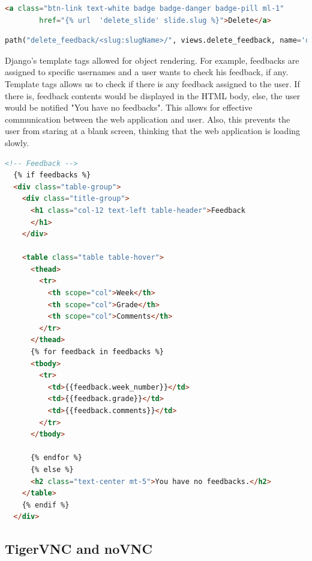 \documentclass{l4proj}
\begin{document}
\begin{lstlisting}[language=HTML, caption={The slug, typically used in URL for a short label of something, is being passed to Django's URL handling.}, label=lst:slide_deletion_template_to_url]
<a class="btn-link text-white badge badge-danger badge-pill ml-1"
        href="{% url  'delete_slide' slide.slug %}">Delete</a>
\end{lstlisting}

\begin{lstlisting}[language=python, caption={Django's URL handling receives it and sends it to the corresponding view.}, label=lst:slide_deletion_url_to_view]
path("delete_feedback/<slug:slugName>/", views.delete_feedback, name='delete_feedback'),
\end{lstlisting}


Django's template tags allowed for object rendering. For example, feedbacks are assigned to specific usernames and a user wants to check his feedback, if any. Template tags allows us to check if there is any feedback assigned to the user. If there is, feedback contents would be displayed in the HTML body, else, the user would be notified "You have no feedbacks". This allows for effective communication between the web application and user. Also, this prevents the user from staring at a blank screen, thinking that the web application is loading slowly. 

\begin{lstlisting}[language=HTML, caption={Django's template tag is used to check and display user feedback.}, label=lst:feedback_page]
 <!-- Feedback -->
  {% if feedbacks %}
  <div class="table-group">
    <div class="title-group">
      <h1 class="col-12 text-left table-header">Feedback
      </h1>
    </div>

    <table class="table table-hover">
      <thead>
        <tr>
          <th scope="col">Week</th>
          <th scope="col">Grade</th>
          <th scope="col">Comments</th>
        </tr>
      </thead>
      {% for feedback in feedbacks %}
      <tbody>
        <tr>
          <td>{{feedback.week_number}}</td>
          <td>{{feedback.grade}}</td>
          <td>{{feedback.comments}}</td>
        </tr>
      </tbody>

      {% endfor %}
      {% else %}
      <h2 class="text-center mt-5">You have no feedbacks.</h2>
    </table>
    {% endif %}
  </div>
\end{lstlisting}

\subsection{TigerVNC and noVNC}
\end{document}
